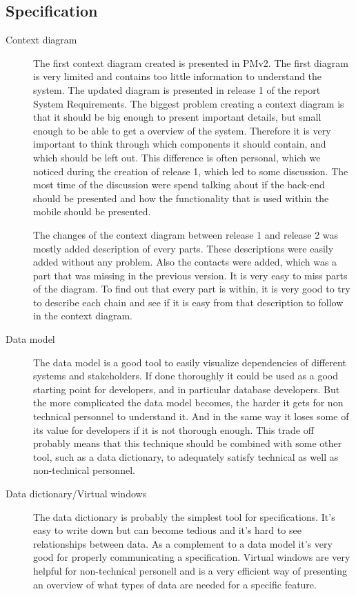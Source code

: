 \documentclass[10pt,a4paper]{article}
\begin{document}
\subsection{Specification}
\begin{description}
\item[Context diagram] The first context diagram created is presented in PMv2. The first diagram is very limited and contains too little information to understand the system. The updated diagram is presented in release 1 of the report System Requirements. The biggest problem creating a context diagram is that it should be big enough to present important details, but small enough to be able to get a overview of the system. Therefore it is very important to think through which components it should contain, and which should be left out. This difference is often personal, which we noticed during the creation of release 1, which led to some discussion. The most time of the discussion were spend talking about if the back-end should be presented and how the functionality that is used within the mobile should be presented. 

The changes of the context diagram between release 1 and release 2 was mostly added description of every parts. These descriptions were easily added without any problem. Also the contacts were added, which was a part that was missing in the previous version. It is very easy to miss parts of the diagram. To find out that every part is within, it is very good to try to describe each chain and see if it is easy from that description to follow in the context diagram. 

\item[Data model] The data model is a good tool to easily visualize dependencies of different systems and stakeholders. If done  thoroughly it could be used as a good starting point for developers, and in particular database developers. But the more complicated the data model becomes, the harder it gets for non technical personnel to understand it. And in the same way it loses some of its value for developers if it is not thorough enough. This trade off probably means that this technique should be combined with some other tool, such as a data dictionary, to adequately satisfy technical as well as non-technical personnel. 

\item[Data dictionary/Virtual windows] The data dictionary is probably the simplest tool for specifications. It's easy to write down but can become tedious and it's hard to see relationships between data. As a complement to a data model it's very good for properly communicating a specification. Virtual windows are very helpful for non-technical personell and is a very efficient way of presenting an overview of what types of data are needed for a specific feature. 
\end{description}
\end{document}
